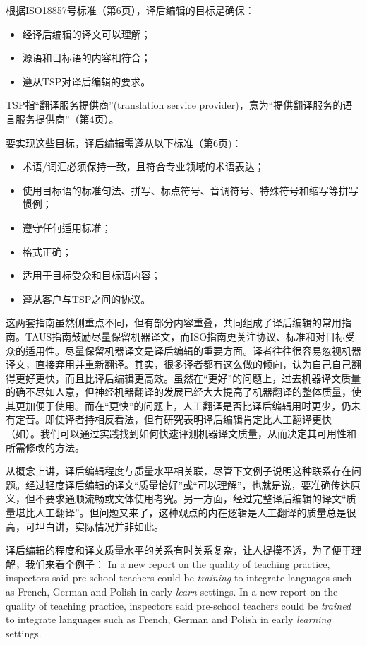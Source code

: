 \documentclass[output=paper,colorlinks,citecolor=brown]{langscibook}
\begin{document}
根据ISO18857号标准（第6页），译后编辑的目标是确保：

\begin{itemize}
\item 经译后编辑的译文可以理解；
\item 源语和目标语的内容相符合；
\item 遵从TSP对译后编辑的要求。
\end{itemize}

TSP指“翻译服务提供商”(translation service provider)，意为“提供翻译服务的语言服务提供商”（第4页）。

要实现这些目标，译后编辑需遵从以下标准（第6页)：
\begin{itemize}
\item 术语/词汇必须保持一致，且符合专业领域的术语表达；
\item 使用目标语的标准句法、拼写、标点符号、音调符号、特殊符号和缩写等拼写惯例；
\item 遵守任何适用标准；
\item 格式正确；
\item 适用于目标受众和目标语内容；
\item 遵从客户与TSP之间的协议。
\end{itemize}

这两套指南虽然侧重点不同，但有部分内容重叠，共同组成了译后编辑的常用指南。TAUS指南鼓励尽量保留机器译文，而ISO指南更关注协议、标准和对目标受众的适用性。尽量保留机器译文是译后编辑的重要方面。译者往往很容易忽视机器译文，直接弃用并重新翻译。其实，很多译者都有这么做的倾向，认为自己自己翻得更好更快，而且比译后编辑更高效。虽然在“更好”的问题上，过去机器译文质量的确不尽如人意，但神经机器翻译的发展已经大大提高了机器翻译的整体质量，使其更加便于使用。而在“更快”的问题上，人工翻译是否比译后编辑用时更少，仍未有定音。即使译者持相反看法，但有研究表明译后编辑肯定比人工翻译更快（如\citealt{GuerberofArenas2014}）。我们可以通过实践找到如何快速评测机器译文质量，从而决定其可用性和所需修改的方法。

从概念上讲，译后编辑程度与质量水平相关联，尽管下文例子说明这种联系存在问题。经过轻度译后编辑的译文“质量恰好”或“可以理解”，也就是说，要准确传达原义，但不要求通顺流畅或文体使用考究。另一方面，经过完整译后编辑的译文“质量堪比人工翻译”。但问题又来了，这种观点的内在逻辑是人工翻译的质量总是很高，可坦白讲，实际情况并非如此。

译后编辑的程度和译文质量水平的关系有时关系复杂，让人捉摸不透，为了便于理解，我们来看个例子：
\ea
\ea In a new report on the quality of teaching practice, inspectors said pre-school teachers could be \textit{training} to integrate languages such as French, German and Polish in early \textit{learn} settings.
\ex In a new report on the quality of teaching practice, inspectors said pre-school teachers could be \textit{trained} to integrate languages such as French, German and Polish in early \textit{learning} settings.
\z
\z
\end{document}

